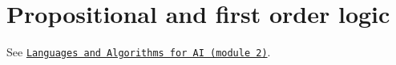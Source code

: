 \chapter{Propositional and first order logic}

See \href{https://github.com/NotXia/unibo-ai-notes/tree/pdfs/languages-and-algorithms-for-ai/module2}{\texttt{Languages and Algorithms for AI (module 2)}}.